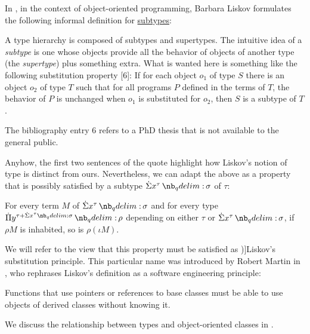 \begin{concept}\label{con:liskov_substitution_principle}
  In \cite[25]{Liskov1987DataAbstractionAndHierarchy}, in the context of object-oriented programming, Barbara Liskov formulates the following informal definition for \hyperref[def:subtype]{subtypes}:
  \begin{displayquote}
    A type hierarchy is composed of subtypes and supertypes. The intuitive idea of a \textit{subtype} is one whose objects provide all the behavior of objects of another type (the \textit{supertype}) plus something extra. What is wanted here is something like the following substitution property [6]: If for each object \( o_1 \) of type \( S \) there is an object \( o_2 \) of type \( T \) such that for all programs \( P \) defined in the terms of \( T \), the behavior of \( P \) is unchanged when \( o_1 \) is substituted for \( o_2 \), then \( S \) is a subtype of \( T \).
  \end{displayquote}

  The bibliography entry \( 6 \) refers to a PhD thesis that is not available to the general public.

  Anyhow, the first two sentences of the quote highlight how Liskov's notion of type is distinct from ours. Nevertheless, we can adapt the above as a property that is possibly satisfied by a subtype \( \qsum {x^\tau} \sigma \) of \( \tau \):
  \begin{displayquote}
    For every term \( M \) of \( \qsum {x^\tau} \sigma \) and for every type \( \qprod {y^{\tau + \qsum {x^\tau} \sigma}} \rho \) depending on either \( \tau \) or \( \qsum {x^\tau} \sigma \), if \( \rho M \) is inhabited, so is \( \rho (\iota M) \).
  \end{displayquote}

  We will refer to the view that this property must be satisfied as \term[en=(the) Liskov substitution principle (\cite*[1]{Martin1996LiskovSubstitutionPrinciple})]{Liskov's substitution principle}. This particular name was introduced by Robert Martin in \cite[1]{Martin1996LiskovSubstitutionPrinciple}, who rephrases Liskov's definition as a software engineering principle:
  \begin{displayquote}
    Functions that use pointers or references to base classes must be able to use objects of derived classes without knowing it.
  \end{displayquote}

  We discuss the relationship between types and object-oriented classes in .
\end{concept}

